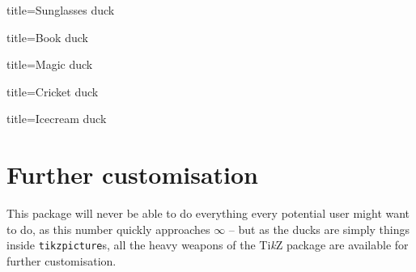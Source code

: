 \documentclass[parskip=half]{scrartcl}
\newcommand{\TikZ}{Ti\emph{k}Z\xspace}
\begin{document}
\begin{tcblisting}{title={Sunglasses duck}}
\begin{tikzpicture}
	\duck[sunglasses=blue]
\end{tikzpicture}
\end{tcblisting}

\begin{tcblisting}{title={Book duck}}
\begin{tikzpicture}
	\duck[book=\scalebox{0.5}{\TeX}]
\end{tikzpicture}
\begin{tikzpicture}
\duck[book=\scalebox{0.6}{$\pi$}, bookcolour=blue!50!black]
\end{tikzpicture}
\end{tcblisting}

\begin{tcblisting}{title={Magic duck}}
\begin{tikzpicture}
	\duck[magichat=teal,
				magicstars=blue!30!cyan,
				magicwand]
\end{tikzpicture}
\end{tcblisting}

\begin{tcblisting}{title={Cricket duck}}
\begin{tikzpicture}
	\duck[cricket=red!50!black]
\end{tikzpicture}
\end{tcblisting}

\begin{tcblisting}{title={Icecream duck}}
\begin{tikzpicture}
	\duck[icecream]
\end{tikzpicture}
\begin{tikzpicture}
	\duck[icecream=brown, 
	      flavoura=brown, 
				flavourb=white, 
				flavourc=red]
\end{tikzpicture}
\end{tcblisting}

\clearpage
\section{Further customisation}

This package will never be able to do everything every potential user might want to do, as this number quickly approaches $\infty$ -- but as the ducks are simply things inside \lstinline|tikzpicture|s, all the heavy weapons of the \TikZ package are available for further customisation.
\end{document}

